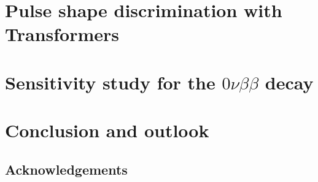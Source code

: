 \documentclass[11pt]{article}
\numberwithin{equation}{section} %
\begin{document}
\section{Pulse shape discrimination with Transformers} 
\label{sec:05_PSD_efficiency}
 


\clearpage
\section{Sensitivity study for the \texorpdfstring{$0 \nu \beta \beta$ decay}{}}
\label{sec:06_Sensitivity}
 


\clearpage
\section{Conclusion and outlook} 
\label{sec:07_conculsion}


\clearpage
\pagestyle{plain}
\begin{center}
\section*{Acknowledgements}
\end{center}



\clearpage
\pagestyle{plain} %
\printbibliography
\end{document}
